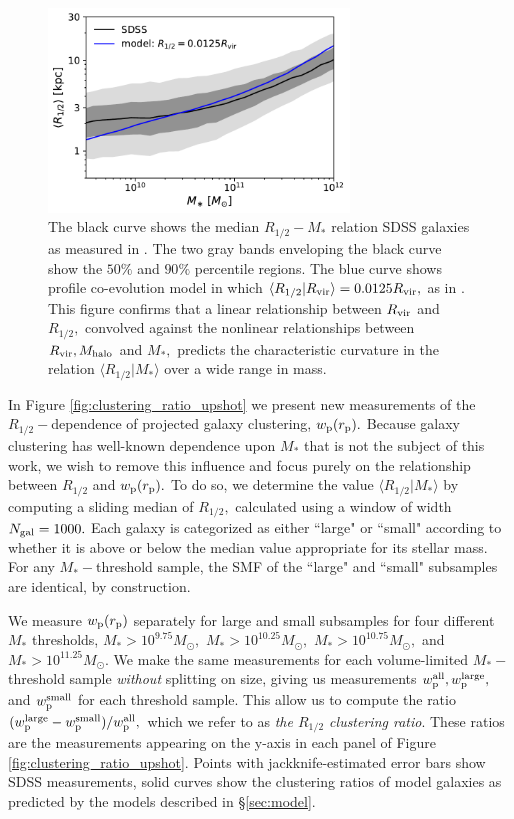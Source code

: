 \documentclass[usenatbib,usegraphicx,letterpaper]{mn2e}
\newcommand{\rhalf}{R_{1/2}}
\newcommand{\mstar}{M_{\ast}}
\newcommand{\mhalo}{M_{\rm halo}}
\newcommand{\rvir}{R_{\rm vir}}
\newcommand{\rproj}{r_{\rm p}}
\newcommand{\wproj}{w_{\rm p}}
\newcommand{\wplarge}{w_{\rm p}^{\rm large}}
\newcommand{\wpsmall}{w_{\rm p}^{\rm small}}
\newcommand{\wpall}{w_{\rm p}^{\rm all}}
\newcommand{\msun}{M_\odot}
\begin{document}
\begin{figure}
\centering
\includegraphics[width=8cm]{FIGS/rhalf_vs_mstar_fiducial_model.pdf}
\caption{The black curve shows the median $\rhalf-\mstar$ relation SDSS galaxies as measured in \citet{meert_etal15}. The two gray bands enveloping the black curve show the $50\%$ and $90\%$ percentile regions. The blue curve shows profile co-evolution model in which $\langle\rhalf\vert\rvir\rangle=0.0125\rvir,$ as in \citet{kravtsov13}. This figure confirms that a linear relationship between $\rvir$ and $\rhalf,$ convolved against the nonlinear relationships between $\rvir, \mhalo$ and $\mstar,$  predicts the characteristic curvature in the relation $\langle\rhalf\vert\mstar\rangle$ over a wide range in mass.
}
\label{fig:scatter_plot}
\end{figure}

In Figure \ref{fig:clustering_ratio_upshot} we present new measurements of the $\rhalf-$dependence of projected galaxy clustering, $\wproj(\rproj).$ Because galaxy clustering has well-known dependence upon $\mstar$ that is not the subject of this work, we wish to remove this influence and focus purely on the relationship between $\rhalf$ and $\wproj(\rproj).$ To do so, we determine the value $\langle\rhalf\vert\mstar\rangle$ by computing a sliding median of $\rhalf,$ calculated using a window of width $N_{\rm gal}=1000.$ Each galaxy is categorized as either ``large" or ``small" according to whether it is above or below the median value appropriate for its stellar mass. For any $\mstar-$threshold sample, the SMF of the ``large" and ``small" subsamples are identical, by construction. 

We measure $\wproj(\rproj)$ separately for large and small subsamples for four different $\mstar$ thresholds, $\mstar>10^{9.75}\msun,$ $\mstar>10^{10.25}\msun,$ $\mstar>10^{10.75}\msun,$ and $\mstar>10^{11.25}\msun.$ We make the same measurements for each volume-limited $\mstar-$threshold sample {\em without} splitting on size, giving us measurements $\wpall, \wplarge,$ and $\wpsmall$ for each threshold sample. This allow us to compute the ratio $(\wplarge-\wpsmall)/\wpall,$ which we refer to as {\em the $\rhalf$ clustering ratio}. These ratios are the measurements appearing on the y-axis in each panel of Figure \ref{fig:clustering_ratio_upshot}. Points with jackknife-estimated error bars show SDSS measurements, solid curves show the clustering ratios of model galaxies as predicted by the models described in \S\ref{sec:model}. 
\end{document}
